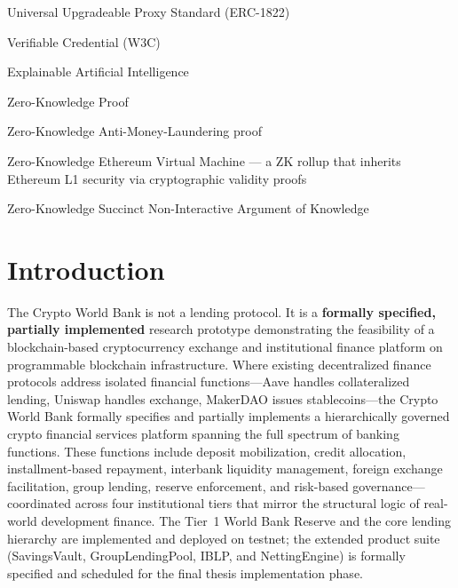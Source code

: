 \documentclass[12pt,a4paper]{report}
\begin{document}
\begin{description}[leftmargin=0pt]
    \item[UUPS:] Universal Upgradeable Proxy Standard (ERC-1822)
    \item[VC:] Verifiable Credential (W3C)
    \item[XAI:] Explainable Artificial Intelligence
    \item[ZKP:] Zero-Knowledge Proof
    \item[zkAML:] Zero-Knowledge Anti-Money-Laundering proof
    \item[zkEVM:] Zero-Knowledge Ethereum Virtual Machine --- a ZK rollup that inherits Ethereum L1 security via cryptographic validity proofs
    \item[zk-SNARK:] Zero-Knowledge Succinct Non-Interactive Argument of Knowledge
\end{description}
\newpage
{}
\setcounter{page}{1}


\chapter{Introduction}

The Crypto World Bank is not a lending protocol. It is a \textbf{formally specified, partially implemented} research prototype demonstrating the feasibility of a blockchain-based cryptocurrency exchange and institutional finance platform on programmable blockchain infrastructure. Where existing decentralized finance protocols address isolated financial functions---Aave handles collateralized lending, Uniswap handles exchange, MakerDAO issues stablecoins---the Crypto World Bank formally specifies and partially implements a hierarchically governed crypto financial services platform spanning the full spectrum of banking functions. These functions include deposit mobilization, credit allocation, installment-based repayment, interbank liquidity management, foreign exchange facilitation, group lending, reserve enforcement, and risk-based governance---coordinated across four institutional tiers that mirror the structural logic of real-world development finance. The Tier~1 World Bank Reserve and the core lending hierarchy are implemented and deployed on testnet; the extended product suite (SavingsVault, GroupLendingPool, IBLP, and NettingEngine) is formally specified and scheduled for the final thesis implementation phase.
\end{document}

